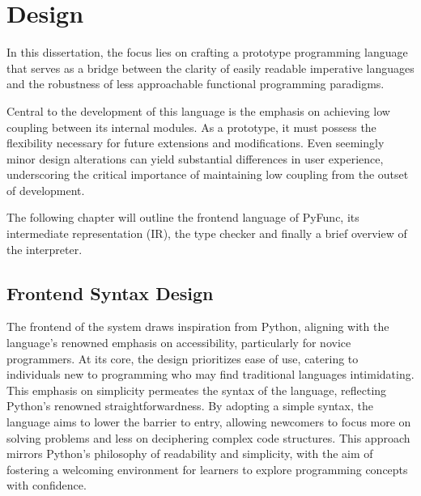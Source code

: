 \documentclass{l4proj}
\begin{document}

\chapter{Design}


In this dissertation, the focus lies on crafting a prototype programming language that serves as a bridge between the clarity of easily readable imperative languages and the robustness of less approachable functional programming paradigms.

Central to the development of this language is the emphasis on achieving low coupling between its internal modules.
As a prototype, it must possess the flexibility necessary for future extensions and modifications.
Even seemingly minor design alterations can yield substantial differences in user experience, underscoring the critical importance of maintaining low coupling from the outset of development.

The following chapter will outline the frontend language of PyFunc, its intermediate representation (IR), the type checker and finally a brief overview of the interpreter.

\section{Frontend Syntax Design} \label{sec:frontend-syntax-design}

The frontend of the system draws inspiration from Python, aligning with the language's renowned emphasis on accessibility, particularly for novice programmers.
At its core, the design prioritizes ease of use, catering to individuals new to programming who may find traditional languages intimidating.
This emphasis on simplicity permeates the syntax of the language, reflecting Python's renowned straightforwardness.
By adopting a simple syntax, the language aims to lower the barrier to entry, allowing newcomers to focus more on solving problems and less on deciphering complex code structures.
This approach mirrors Python's philosophy of readability and simplicity, with the aim of fostering a welcoming environment for learners to explore programming concepts with confidence.
\end{document}
